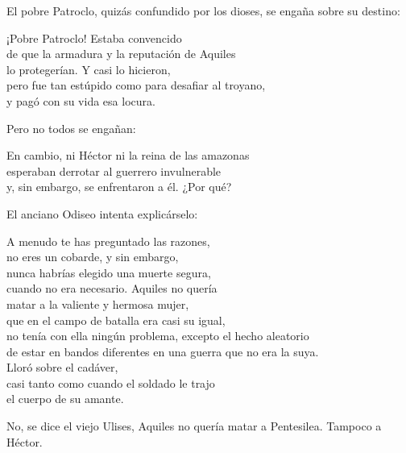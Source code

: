 El pobre Patroclo, quizás confundido por los dioses, se engaña sobre su destino:

\begin{versopropio}
¡Pobre Patroclo! Estaba convencido\\
de que la armadura y la reputación de Aquiles\\
lo protegerían. Y casi lo hicieron,\\
pero fue tan estúpido como para desafiar al troyano,\\
y pagó con su vida esa locura.
\end{versopropio}

Pero no todos se engañan:

\begin{versopropio}
En cambio, ni Héctor ni la reina de las amazonas\\
esperaban derrotar al guerrero invulnerable\\
y, sin embargo, se enfrentaron a él. ¿Por qué?
\end{versopropio}

El anciano Odiseo intenta explicárselo:

\begin{versopropio}
A menudo te has preguntado las razones,\\
no eres un cobarde, y sin embargo,\\
nunca habrías elegido una muerte segura,\\
cuando no era necesario. Aquiles no quería\\
matar a la valiente y hermosa mujer,\\
que en el campo de batalla era casi su igual,\\
no tenía con ella ningún problema, excepto el hecho aleatorio\\
de estar en bandos diferentes en una guerra que no era la suya.\\
Lloró sobre el cadáver,\\
casi tanto como cuando el soldado le trajo\\
el cuerpo de su amante.
\end{versopropio}

No, se dice el viejo Ulises, Aquiles no quería matar a Pentesilea. Tampoco a Héctor.

